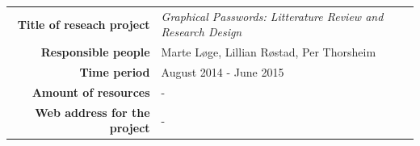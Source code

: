 \begin{titlepage}
\begin{center}
  \begin{table}[H]
    \centering
    \begin{tabular}{ r  p{7cm} }
      {\bf Title of reseach project} & {\it Graphical Passwords: Litterature Review and Research Design} \\ 
      {\bf Responsible people} & Marte Løge, Lillian Røstad, Per Thorsheim \\ 
      {\bf Time period}  & August 2014 - June 2015 \\ 
      {\bf Amount of resources} &  - \\ 
      {\bf Web address for the project} & - \\ 
    \end{tabular}
  \end{table} 

\noindent\makebox[\linewidth]{\rule{\textwidth}{1pt}} \\


\end{center}
\end{titlepage}